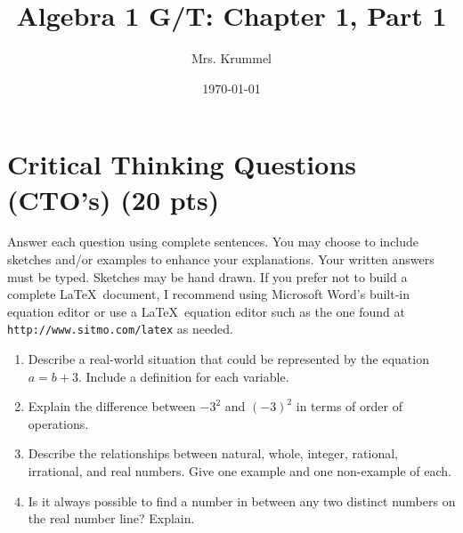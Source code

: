 \documentclass[11pt]{article}
\begin{document}
\title{Algebra 1 G/T: Chapter 1, Part 1}
\author{Mrs. Krummel}
\date{\today}
\maketitle

\section{Critical Thinking Questions (CTO's) (20 pts)}

Answer each question using complete sentences. You may choose to include sketches and/or examples to enhance your explanations. Your written answers must be typed. Sketches may be hand drawn. If you prefer not to build a complete \LaTeX \ document, I recommend using Microsoft Word's built-in equation editor or use a \LaTeX \ equation editor such as the one found at \texttt{http://www.sitmo.com/latex} as needed.

\begin{enumerate}
\item Describe a real-world situation that could be represented by the equation $a=b+3$. Include a definition for each variable.
\item Explain the difference between $-3^2$ and $(-3)^2$ in terms of order of operations.
\item Describe the relationships between natural, whole, integer, rational, irrational, and real numbers. Give one example and one non-example of each.
\item Is it always possible to find a number in between any two distinct numbers on the real number line? Explain.
\end{enumerate}
\end{document}
